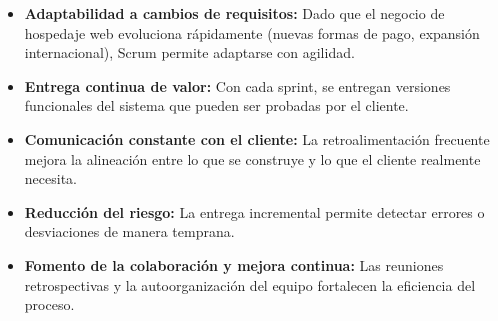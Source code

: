 \begin{itemize}
    \item \textbf{Adaptabilidad a cambios de requisitos:} Dado que el negocio de hospedaje web evoluciona rápidamente (nuevas formas de pago, expansión internacional), Scrum permite adaptarse con agilidad.
    \item \textbf{Entrega continua de valor:} Con cada sprint, se entregan versiones funcionales del sistema que pueden ser probadas por el cliente.
    \item \textbf{Comunicación constante con el cliente:} La retroalimentación frecuente mejora la alineación entre lo que se construye y lo que el cliente realmente necesita.
    \item \textbf{Reducción del riesgo:} La entrega incremental permite detectar errores o desviaciones de manera temprana.
    \item \textbf{Fomento de la colaboración y mejora continua:} Las reuniones retrospectivas y la autoorganización del equipo fortalecen la eficiencia del proceso.
\end{itemize}
